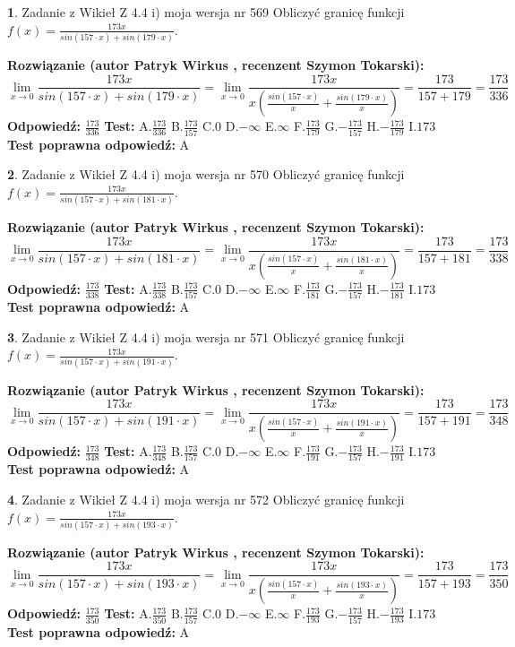 \documentclass[12pt, a4paper]{article}
\theoremstyle{definition} %
\newtheorem{zad}{}
\newcommand{\zadStart}[1]{\begin{zad}#1\newline}
\newcommand{\zadStop}{\end{zad}}
\newcommand{\rozwStart}[2]{\noindent \textbf{Rozwiązanie (autor #1 , recenzent #2): }\newline}
\newcommand{\rozwStop}{\newline}
\newcommand{\odpStart}{\noindent \textbf{Odpowiedź:}\newline}
\newcommand{\odpStop}{\newline}
\newcommand{\testStart}{\noindent \textbf{Test:}\newline}
\newcommand{\testStop}{\newline}
\newcommand{\kluczStart}{\noindent \textbf{Test poprawna odpowiedź:}\newline}
\newcommand{\kluczStop}{\newline}
\begin{document}
\zadStart{Zadanie z Wikieł Z 4.4 i) moja wersja nr 569}
Obliczyć granicę funkcji $f(x)=\frac{173x}{sin(157\cdot x) +sin(179\cdot x)}$.
\zadStop
\rozwStart{Patryk Wirkus}{Szymon Tokarski}
$$\lim\limits_{x\to 0}\frac{173x}{sin(157\cdot x) +sin(179\cdot x)}=\lim\limits_{x\to 0}\frac{173x}{x(\frac{sin(157\cdot x)}{x}+\frac{sin(179\cdot x)}{x})}=\frac{173}{157+179} = \frac{173}{336}$$
\rozwStop
\odpStart
$\frac{173}{336}$
\odpStop
\testStart
A.$\frac{173}{336}$
B.$\frac{173}{157}$
C.$0$
D.$-\infty$
E.$\infty$
F.$\frac{173}{179}$
G.$-\frac{173}{157}$
H.$-\frac{173}{179}$
I.$173$
\testStop
\kluczStart
A
\kluczStop



\zadStart{Zadanie z Wikieł Z 4.4 i) moja wersja nr 570}
Obliczyć granicę funkcji $f(x)=\frac{173x}{sin(157\cdot x) +sin(181\cdot x)}$.
\zadStop
\rozwStart{Patryk Wirkus}{Szymon Tokarski}
$$\lim\limits_{x\to 0}\frac{173x}{sin(157\cdot x) +sin(181\cdot x)}=\lim\limits_{x\to 0}\frac{173x}{x(\frac{sin(157\cdot x)}{x}+\frac{sin(181\cdot x)}{x})}=\frac{173}{157+181} = \frac{173}{338}$$
\rozwStop
\odpStart
$\frac{173}{338}$
\odpStop
\testStart
A.$\frac{173}{338}$
B.$\frac{173}{157}$
C.$0$
D.$-\infty$
E.$\infty$
F.$\frac{173}{181}$
G.$-\frac{173}{157}$
H.$-\frac{173}{181}$
I.$173$
\testStop
\kluczStart
A
\kluczStop



\zadStart{Zadanie z Wikieł Z 4.4 i) moja wersja nr 571}
Obliczyć granicę funkcji $f(x)=\frac{173x}{sin(157\cdot x) +sin(191\cdot x)}$.
\zadStop
\rozwStart{Patryk Wirkus}{Szymon Tokarski}
$$\lim\limits_{x\to 0}\frac{173x}{sin(157\cdot x) +sin(191\cdot x)}=\lim\limits_{x\to 0}\frac{173x}{x(\frac{sin(157\cdot x)}{x}+\frac{sin(191\cdot x)}{x})}=\frac{173}{157+191} = \frac{173}{348}$$
\rozwStop
\odpStart
$\frac{173}{348}$
\odpStop
\testStart
A.$\frac{173}{348}$
B.$\frac{173}{157}$
C.$0$
D.$-\infty$
E.$\infty$
F.$\frac{173}{191}$
G.$-\frac{173}{157}$
H.$-\frac{173}{191}$
I.$173$
\testStop
\kluczStart
A
\kluczStop



\zadStart{Zadanie z Wikieł Z 4.4 i) moja wersja nr 572}
Obliczyć granicę funkcji $f(x)=\frac{173x}{sin(157\cdot x) +sin(193\cdot x)}$.
\zadStop
\rozwStart{Patryk Wirkus}{Szymon Tokarski}
$$\lim\limits_{x\to 0}\frac{173x}{sin(157\cdot x) +sin(193\cdot x)}=\lim\limits_{x\to 0}\frac{173x}{x(\frac{sin(157\cdot x)}{x}+\frac{sin(193\cdot x)}{x})}=\frac{173}{157+193} = \frac{173}{350}$$
\rozwStop
\odpStart
$\frac{173}{350}$
\odpStop
\testStart
A.$\frac{173}{350}$
B.$\frac{173}{157}$
C.$0$
D.$-\infty$
E.$\infty$
F.$\frac{173}{193}$
G.$-\frac{173}{157}$
H.$-\frac{173}{193}$
I.$173$
\testStop
\kluczStart
A
\kluczStop
\end{document}
